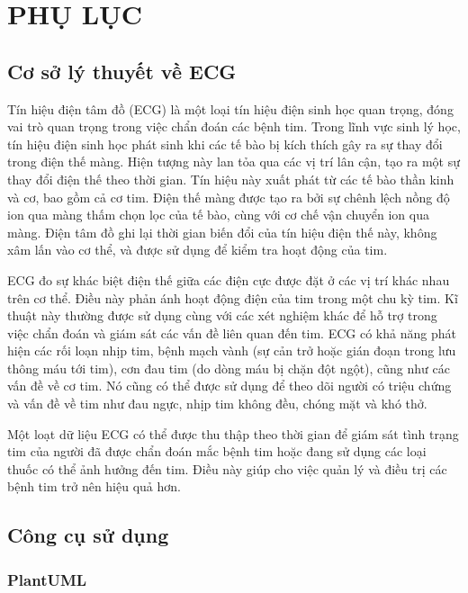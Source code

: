 
\section*{PHỤ LỤC}

\subsection*{Cơ sở lý thuyết về ECG}

Tín hiệu điện tâm đồ (ECG) là một loại tín hiệu điện sinh học quan trọng, đóng vai trò quan trọng trong việc chẩn đoán các bệnh tim. Trong lĩnh vực sinh lý học, tín hiệu điện sinh học phát sinh khi các tế bào bị kích thích gây ra sự thay đổi trong điện thế màng. Hiện tượng này lan tỏa qua các vị trí lân cận, tạo ra một sự thay đổi điện thế theo thời gian. Tín hiệu này xuất phát từ các tế bào thần kinh và cơ, bao gồm cả cơ tim. Điện thế màng được tạo ra bởi sự chênh lệch nồng độ ion qua màng thấm chọn lọc của tế bào, cùng với cơ chế vận chuyển ion qua màng. Điện tâm đồ ghi lại thời gian biến đổi của tín hiệu điện thế này, không xâm lấn vào cơ thể, và được sử dụng để kiểm tra hoạt động của tim.


ECG đo sự khác biệt điện thế giữa các điện cực được đặt ở các vị trí khác nhau trên cơ thể. Điều này phản ánh hoạt động điện của tim trong một chu kỳ tim. Kĩ thuật này thường được sử dụng cùng với các xét nghiệm khác để hỗ trợ trong việc chẩn đoán và giám sát các vấn đề liên quan đến tim. ECG có khả năng phát hiện các rối loạn nhịp tim, bệnh mạch vành (sự cản trở hoặc gián đoạn trong lưu thông máu tới tim), cơn đau tim (do dòng máu bị chặn đột ngột), cũng như các vấn đề về cơ tim. Nó cũng có thể được sử dụng để theo dõi người có triệu chứng và vấn đề về tim như đau ngực, nhịp tim không đều, chóng mặt và khó thở.


Một loạt dữ liệu ECG có thể được thu thập theo thời gian để giám sát tình trạng tim của người đã được chẩn đoán mắc bệnh tim hoặc đang sử dụng các loại thuốc có thể ảnh hưởng đến tim. Điều này giúp cho việc quản lý và điều trị các bệnh tim trở nên hiệu quả hơn.


\subsection*{Công cụ sử dụng}


\subsubsection*{PlantUML}

